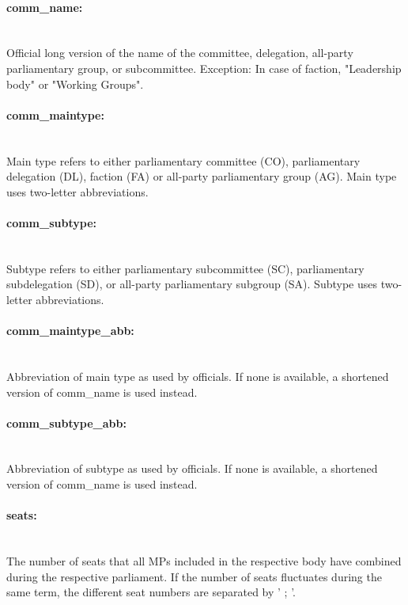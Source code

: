 \documentclass{article}
\begin{document}
\paragraph{comm\_name:}\\
    Official long version of the name of the committee, delegation, all-party parliamentary group, or subcommittee. Exception: In case of faction, "Leadership body" or "Working Groups".
    
\paragraph{comm\_maintype:}\\
    Main type refers to either parliamentary committee  (CO), parliamentary delegation (DL), faction (FA) or all-party parliamentary group (AG). Main type uses two-letter abbreviations.  
  
\paragraph{comm\_subtype:}\\
    Subtype refers to either parliamentary subcommittee (SC), parliamentary subdelegation (SD), or all-party parliamentary subgroup (SA). Subtype uses two-letter abbreviations.


\paragraph{comm\_maintype\_abb:}\\
    Abbreviation of main type as used by officials. If none is available, a shortened version of comm\_name is used instead.


\paragraph{comm\_subtype\_abb:}\\
    Abbreviation of subtype as used by officials. If none is available, a shortened version of comm\_name is used instead.

\paragraph{seats:}\\
The number of seats that all MPs included in the respective body have combined during the respective parliament. If the number of seats fluctuates during the same term, the different seat numbers are separated by ' ; '.
\end{document}
